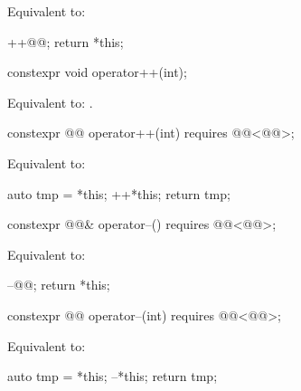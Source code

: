 \begin{itemdescr}
\pnum
\effects
Equivalent to:
\begin{codeblock}
++@@;
return *this;
\end{codeblock}
\end{itemdescr}

%
\begin{itemdecl}
constexpr void operator++(int);
\end{itemdecl}

\begin{itemdescr}
\pnum
\effects
Equivalent to: .
\end{itemdescr}

%
\begin{itemdecl}
constexpr @@ operator++(int) requires @@<@@>;
\end{itemdecl}

\begin{itemdescr}
\pnum
\effects
Equivalent to:
\begin{codeblock}
auto tmp = *this;
++*this;
return tmp;
\end{codeblock}
\end{itemdescr}

%
\begin{itemdecl}
constexpr @@& operator--() requires @@<@@>;
\end{itemdecl}

\begin{itemdescr}
\pnum
\effects
Equivalent to:
\begin{codeblock}
--@@;
return *this;
\end{codeblock}
\end{itemdescr}

%
\begin{itemdecl}
constexpr @@ operator--(int) requires @@<@@>;
\end{itemdecl}

\begin{itemdescr}
\pnum
\effects
Equivalent to:
\begin{codeblock}
auto tmp = *this;
--*this;
return tmp;
\end{codeblock}
\end{itemdescr}


